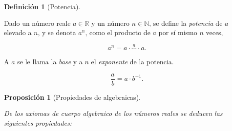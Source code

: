 \documentclass[
  a4paper,
]{scrreport}
\theoremstyle{definition}
\theoremstyle{plain}
\theoremstyle{plain}
\theoremstyle{plain}
\newtheorem{proposition}{Proposición}[chapter]
\theoremstyle{definition}
\newtheorem{definition}{Definición}[chapter]
\theoremstyle{remark}
\begin{document}
\begin{definition}[Potencia]\protect\hypertarget{def-potencia}{}\label{def-potencia}

Dado un número reale \(a\in \mathbb{R}\) y un número \(n\in\mathbb{N}\),
se define la \emph{potencia} de \(a\) elevado a \(n\), y se denota
\(a^n\), como el producto de \(a\) por sí mismo \(n\) veces,

\[a^n = a\cdot \stackrel{n}{\cdots} \cdot a.\]

A \(a\) se le llama la \emph{base} y a \(n\) el \emph{exponente} de la
potencia.

\[\frac{a}{b} = a\cdot b^{-1}.\]

\end{definition}

\begin{proposition}[Propiedades de
algebraicas]\protect\hypertarget{prp-propiedades-algebraicas}{}\label{prp-propiedades-algebraicas}

De los axiomas de cuerpo algebraico de los números reales se deducen las
siguientes propiedades:


\end{proposition}
\end{document}

